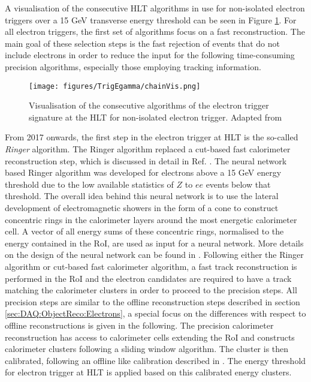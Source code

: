 A visualisation of the consecutive \ac{HLT} algorithms in use for non-isolated electron triggers over a 15 GeV transverse energy threshold can be seen in Figure \ref{fig:TrigEgamma:chainVis}.  For all electron triggers,  the first set of algorithms focus on a fast reconstruction.  The main goal of these selection steps is the fast rejection of events that do not include electrons in order to reduce the input for the following time-consuming precision algorithms,  especially those employing tracking information.
\begin{figure}[htpb]
\centering
\texttt{[image: figures/TrigEgamma/chainVis.png]}
\caption{Visualisation of the consecutive algorithms of the electron trigger signature at the \ac{HLT} for non-isolated electron trigger.  Adapted from \cite{TrigEgammaPaper} \label{fig:TrigEgamma:chainVis}}
\end{figure}
From 2017 onwards,  the first step in the electron trigger at \ac{HLT} is the so-called \textit{Ringer} algorithm.  The Ringer algorithm replaced a cut-based fast calorimeter reconstruction step,  which is discussed in detail in Ref.  \cite{TrigEgammaPaper}. The neural network based Ringer algorithm was developed for electrons above a 15 GeV energy threshold due to the low available statistics of $Z$ to $ee$ events below that threshold.  The overall idea behind this neural network is to use the lateral development of electromagnetic showers in the form of a cone to construct concentric rings in the calorimeter layers around the most energetic calorimeter cell.  A vector of all energy sums of these concentric rings,  normalised to the energy contained in the RoI,  are used as input for a neural network.  More details on the design of the neural network can be found in \cite{TrigEgammaPaper}.
Following either the Ringer algorithm or cut-based fast calorimeter algorithm,  a fast track reconstruction is performed in the RoI and the electron candidates are required to have a track matching the calorimeter clusters in order to proceed to the precision steps. 
All precision steps are similar to the offline reconstruction steps described in section \ref{sec:DAQ:ObjectReco:Electrons},  a special focus on the differences with respect to offline reconstructions is given in the following. 
The precision calorimeter reconstruction has access to calorimeter cells extending the \ac{RoI}  and constructs calorimeter clusters following a sliding window algorithm. 
The cluster is then calibrated,  following an offline like calibration described in \cite{ElecCalibration}.  The energy threshold for electron trigger at \ac{HLT} is applied based on this calibrated energy clusters. 
